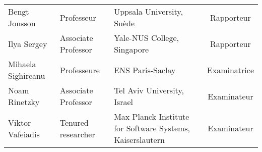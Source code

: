 \begin{titlepage}
\begin{center}
\begin{tabular}{lp{9em}p{12em}c}
    Bengt Jonsson & Professeur & Uppsala University, Suède & Rapporteur\\
    Ilya Sergey & Associate Professor & Yale-NUS College, Singapore & Rapporteur\\
    Mihaela Sighireanu & Professeure & ENS Paris-Saclay & Examinatrice\\
    Noam Rinetzky & Associate Professor & Tel Aviv University, Israel & Examinateur\\
    Viktor Vafeiadis & Tenured researcher & Max Planck Institute for Software Systems, Kaiserslautern & Examinateur\\
    \end{tabular}
  \end{center}
  \makeatother
\end{titlepage}

\newpage
\null
\thispagestyle{empty}
\newpage
